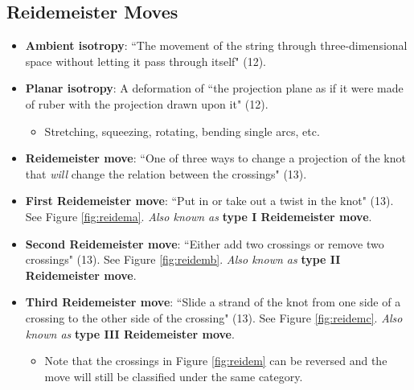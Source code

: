 \documentclass[titlepage]{article}
\numberwithin{figure}{section}
\numberwithin{table}{section}
\numberwithin{equation}{section}
\newcommand{\dq}[2]{``#1" (#2).}
\begin{document}
\subsection{Reidemeister Moves}
\begin{itemize}
    \item \textbf{Ambient isotropy}: \dq{The movement of the string through three-dimensional space without letting it pass through itself}{12}
    \item \textbf{Planar isotropy}: A deformation of \dq{the projection plane as if it were made of ruber with the projection drawn upon it}{12}
    \begin{itemize}
        \item Stretching, squeezing, rotating, bending single arcs, etc.
    \end{itemize}
    \item \textbf{Reidemeister move}: \dq{One of three ways to change a projection of the knot that \emph{will} change the relation between the crossings}{13}
    \item \textbf{First Reidemeister move}: \dq{Put in or take out a twist in the knot}{13} See Figure \ref{fig:reidema}. \emph{Also known as} \textbf{type I Reidemeister move}.
    \item \textbf{Second Reidemeister move}: \dq{Either add two crossings or remove two crossings}{13} See Figure \ref{fig:reidemb}. \emph{Also known as} \textbf{type II Reidemeister move}.
    \item \textbf{Third Reidemeister move}: \dq{Slide a strand of the knot from one side of a crossing to the other side of the crossing}{13} See Figure \ref{fig:reidemc}. \emph{Also known as} \textbf{type III Reidemeister move}.
    \begin{itemize}
        \item Note that the crossings in Figure \ref{fig:reidem} can be reversed and the move will still be classified under the same category.
    \end{itemize}
    \begin{figure}[h!]
        \centering
        \begin{subfigure}[b]{0.3\linewidth}
            \centering
\end{subfigure}
\end{figure}
\end{itemize}
\end{document}

